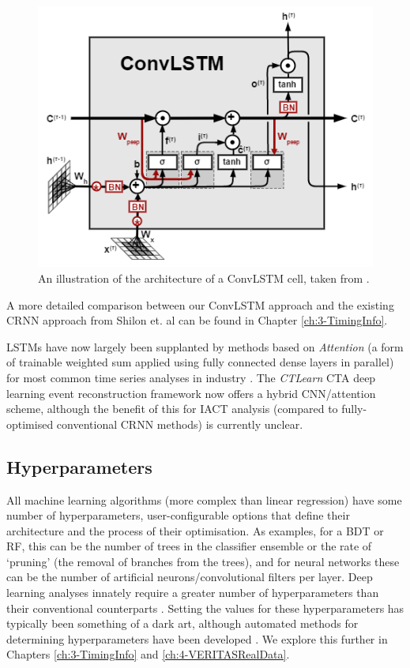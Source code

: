 \begin{figure}[ht] 
        \centering \includegraphics[width=0.5\columnwidth]{figures/convlstmcell.png}
        \caption{
                \label{fig:convlstmcell} %
                An illustration of the architecture of a ConvLSTM cell, taken from \cite{convlstmintro}.
        }
\end{figure}
A more detailed comparison between our ConvLSTM approach and the existing CRNN approach from Shilon et. al \cite{Shilon} can be found in Chapter \ref{ch:3-TimingInfo}.

LSTMs have now largely been supplanted by methods based on \textit{Attention} (a form of trainable weighted sum applied using fully connected dense layers in parallel) for most common time series analyses in industry \cite{attentionisallyouneed}. The \textit{CTLearn} \cite{tjarkicrc} CTA deep learning event reconstruction framework now offers a hybrid CNN/attention scheme, although the benefit of this for IACT analysis (compared to fully-optimised conventional CRNN methods) is currently unclear.

\subsection{Hyperparameters}
All machine learning algorithms (more complex than linear regression) have some number of hyperparameters, user-configurable options that define their architecture and the process of their optimisation. As examples, for a BDT or RF, this can be the number of trees in the classifier ensemble or the rate of `pruning' (the removal of branches from the trees), and for neural networks these can be the number of artificial neurons/convolutional filters per layer. Deep learning analyses innately require a greater number of hyperparameters than their conventional counterparts \cite{hyperopt}. Setting the values for these hyperparameters has typically been something of a dark art, although automated methods for determining hyperparameters have been developed \cite{hyperopt}. We explore this further in Chapters \ref{ch:3-TimingInfo} and \ref{ch:4-VERITASRealData}.

